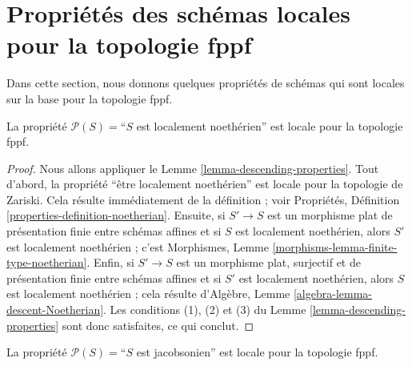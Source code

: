 \section{Propriétés des schémas locales pour la topologie fppf}
\label{section-descending-properties-fppf}

\noindent
Dans cette section, nous donnons quelques propriétés de schémas qui sont
locales sur la base pour la topologie fppf.

\begin{lemma}
\label{lemma-Noetherian-local-fppf}
La propriété $\mathcal{P}(S) =$``$S$ est localement noethérien'' est locale
pour la topologie fppf.
\end{lemma}

\begin{proof}
Nous allons appliquer le Lemme \ref{lemma-descending-properties}.
Tout d'abord, la propriété ``être localement noethérien'' est locale pour la
topologie de Zariski. Cela résulte immédiatement de la définition ; voir
Propriétés, Définition \ref{properties-definition-noetherian}.
Ensuite, si $S' \to S$ est un morphisme plat de présentation finie entre
schémas affines et si $S$ est localement noethérien, alors $S'$ est
localement noethérien ; c'est Morphismes, Lemme
\ref{morphisms-lemma-finite-type-noetherian}. Enfin, si $S' \to S$ est un
morphisme plat, surjectif et de présentation finie entre schémas affines et
si $S'$ est localement noethérien, alors $S$ est localement noethérien ; cela
résulte d'Algèbre, Lemme \ref{algebra-lemma-descent-Noetherian}.
Les conditions (1), (2) et (3) du Lemme
\ref{lemma-descending-properties} sont donc satisfaites, ce qui conclut.
\end{proof}

\begin{lemma}
\label{lemma-Jacobson-local-fppf}
La propriété $\mathcal{P}(S) =$``$S$ est jacobsonien'' est locale pour la
topologie fppf.
\end{lemma}

